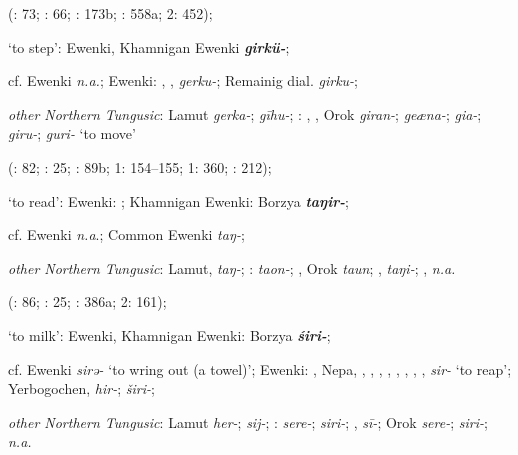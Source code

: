 \documentclass[output=paper,colorlinks,citecolor=brown]{langscibook}
\begin{document}
\begin{xlist}
\begin{xlist}
    (\citealt{Castrén1856}: 73; \citealt{Janhunen1991}: 66; \citealt{Dorji1998}: 173b; \citealt{Vasilevic1958}: 558a; \citealt{Cincius1975B} 2: 452);

    \ex ‘to step’:  Ewenki, Khamnigan Ewenki \textbf{\textit{girkü-}};

    cf.  Ewenki \textit{n.a.};  Ewenki: , ,  \textit{gerku-}; Remainig dial. \textit{girku-};

    \textit{other Northern Tungusic}: Lamut \textit{gerka-};  \textit{gīhu-}; \textit{}: , , Orok \textit{giran-};  \textit{geæna-};  \textit{gia-};  \textit{giru-};  \textit{guri-} ‘to move’
    
    (\citealt{Castrén1856}: 82; \citealt{Janhunen1991}: 25; \citealt{Vasilevic1958}: 89b; \citealt{Cincius1975B} 1: 154--155; \citealt{Hauer1952} 1: 360; \citealt{Zikmundová2013a}: 212);

    \ex ‘to read’:  Ewenki: ; Khamnigan Ewenki: Borzya \textbf{\textit{taŋir-}};

    cf.  Ewenki \textit{n.a}.;  Common Ewenki \textit{taŋ-};

    \textit{other Northern Tungusic}: Lamut,  \textit{taŋ-}; \textit{}:  \textit{taon-}; , Orok \textit{taun}; ,  \textit{taŋi-}; ,  \textit{n.a.} 
    
    (\citealt{Castrén1856}: 86; \citealt{Janhunen1991}: 25; \citealt{Vasilevic1958}: 386a; \citealt{Cincius1975B} 2: 161);

    \ex ‘to milk’:  Ewenki, Khamnigan Ewenki: Borzya \textbf{\textit{śiri-}};

    cf.  Ewenki \textit{sirǝ-} ‘to wring out (a towel)’;  Ewenki: , Nepa, , , , , , , , ,  \textit{sir-} ‘to reap’; Yerbogochen,  \textit{hir-};  \textit{širi-};

    \textit{other Northern Tungusic}: Lamut \textit{her-};  \textit{sij-}; \textit{}:  \textit{sere-};  \textit{siri-}; ,  \textit{sī-}; Orok \textit{sere-};  \textit{siri-};  \textit{n.a.}
    

\end{xlist}
\end{xlist}
\end{document}

